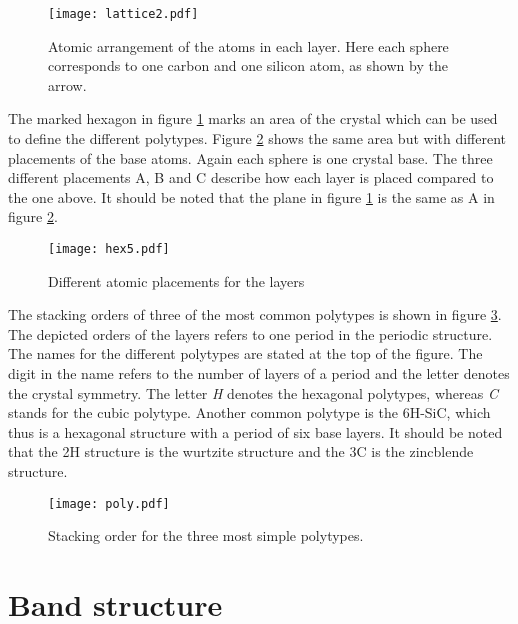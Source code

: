 \begin{figure}[h]
\begin{center}
\texttt{[image: lattice2.pdf]}
\caption{Atomic arrangement of the atoms in each layer. Here each sphere corresponds to one carbon and one silicon atom, as shown by the arrow. 
\label{fig:hex}}
\end{center}
\end{figure}

The marked hexagon in figure \ref{fig:hex} marks an area of the crystal which can be used to define the different polytypes. Figure \ref{fig:stacking1} shows the same area but with different placements of the base atoms. Again each sphere is one crystal base. The three different placements A, B and C describe how each layer is placed compared to the one above. It should be noted that the plane in figure \ref{fig:hex} is the same as A in figure \ref{fig:stacking1}.

\begin{figure}[h]
\begin{center}
\texttt{[image: hex5.pdf]}
\caption{Different atomic placements for the layers
\label{fig:stacking1}}
\end{center}
\end{figure}

The stacking orders of three of the most common polytypes is shown in figure \ref{fig:poly}. The depicted orders of the layers refers to one period in the periodic structure. The names for the different polytypes are stated at the top of the figure. The digit in the name refers to the number of layers of a period and the letter denotes the crystal symmetry. The letter \emph{H} denotes the hexagonal polytypes, whereas \emph{C} stands for the cubic polytype. Another common polytype is the 6H-SiC, which thus is a hexagonal structure with a period of six base layers. It should be noted that the 2H structure is the wurtzite structure and the 3C is the zincblende structure.  

\begin{figure}[h]
\begin{center}
\texttt{[image: poly.pdf]}
\caption{Stacking order for the three most simple polytypes. 
\label{fig:poly}}
\end{center}
\end{figure}

\section{Band structure}
\label{sec:band_structure}

